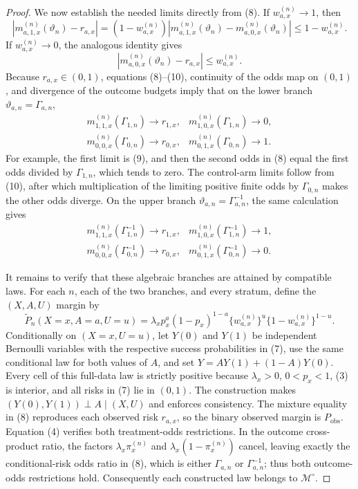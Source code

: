 \documentclass{article}
\begin{document}
\begin{proof}
We now establish the needed limits directly from (8).  If \(w_{a,x}^{(n)}\to1\), then
\[
 \left|m_{a,1,x}^{(n)}(\vartheta_n)-r_{a,x}\right|
 =(1-w_{a,x}^{(n)})
  \left|m_{a,1,x}^{(n)}(\vartheta_n)
        -m_{a,0,x}^{(n)}(\vartheta_n)\right|
 \leq1-w_{a,x}^{(n)}.
 \tag{9}
\]
If \(w_{a,x}^{(n)}\to0\), the analogous identity gives
\[
 \left|m_{a,0,x}^{(n)}(\vartheta_n)-r_{a,x}\right|
 \leq w_{a,x}^{(n)}.
 \tag{10}
\]
Because \(r_{a,x}\in(0,1)\), equations (8)--(10), continuity of the odds map on \((0,1)\), and divergence of the outcome budgets imply that on the lower branch \(\vartheta_{a,n}=\Gamma_{a,n}\),
\[
\begin{array}{ll}
 m_{1,1,x}^{(n)}(\Gamma_{1,n})\longrightarrow r_{1,x},
 &m_{1,0,x}^{(n)}(\Gamma_{1,n})\longrightarrow0,\\
 m_{0,0,x}^{(n)}(\Gamma_{0,n})\longrightarrow r_{0,x},
 &m_{0,1,x}^{(n)}(\Gamma_{0,n})\longrightarrow1.
\end{array}
\tag{11}
\]
For example, the first limit is (9), and then the second odds in (8) equal the first odds divided by \(\Gamma_{1,n}\), which tends to zero.  The control-arm limits follow from (10), after which multiplication of the limiting positive finite odds by \(\Gamma_{0,n}\) makes the other odds diverge.  On the upper branch \(\vartheta_{a,n}=\Gamma_{a,n}^{-1}\), the same calculation gives
\[
\begin{array}{ll}
 m_{1,1,x}^{(n)}(\Gamma_{1,n}^{-1})\longrightarrow r_{1,x},
 &m_{1,0,x}^{(n)}(\Gamma_{1,n}^{-1})\longrightarrow1,\\
 m_{0,0,x}^{(n)}(\Gamma_{0,n}^{-1})\longrightarrow r_{0,x},
 &m_{0,1,x}^{(n)}(\Gamma_{0,n}^{-1})\longrightarrow0.
\end{array}
\tag{12}
\]

It remains to verify that these algebraic branches are attained by compatible laws.  For each \(n\), each of the two branches, and every stratum, define the \((X,A,U)\) margin by
\[
 \widetilde P_n(X=x,A=a,U=u)
 =\lambda_xp_x^a(1-p_x)^{1-a}
  \{w_{a,x}^{(n)}\}^{u}\{1-w_{a,x}^{(n)}\}^{1-u}.
 \tag{13}
\]
Conditionally on \((X=x,U=u)\), let \(Y(0)\) and \(Y(1)\) be independent Bernoulli variables with the respective success probabilities in (7), use the same conditional law for both values of \(A\), and set \(Y=AY(1)+(1-A)Y(0)\).  Every cell of this full-data law is strictly positive because \(\lambda_x>0\), \(0<p_x<1\), (3) is interior, and all risks in (7) lie in \((0,1)\).  The construction makes \((Y(0),Y(1))\perp A\mid(X,U)\) and enforces consistency.  The mixture equality in (8) reproduces each observed risk \(r_{a,x}\), so the binary observed margin is \(P_{\mathrm{obs}}\).  Equation (4) verifies both treatment-odds restrictions.  In the outcome cross-product ratio, the factors \(\lambda_x\pi_x^{(n)}\) and \(\lambda_x(1-\pi_x^{(n)})\) cancel, leaving exactly the conditional-risk odds ratio in (8), which is either \(\Gamma_{a,n}\) or \(\Gamma_{a,n}^{-1}\); thus both outcome-odds restrictions hold.  Consequently each constructed law belongs to \(\mathcal M^{\circ}\).


\end{proof}
\end{document}
